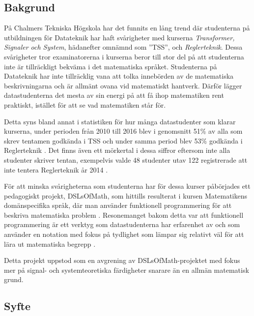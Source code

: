 \documentclass[]{article}
\begin{document}
\subsection{Bakgrund}

%

På Chalmers Tekniska Högskola har det funnits en lång trend där
studenterna på utbildningen för Datateknik har haft svårigheter
med kurserna \textit{Transformer, Signaler och System}, hädanefter omnämnd
som ''TSS'', och \textit{Reglerteknik}.
Dessa svårigheter tror examinatorerna i kurserna beror till stor del på att
studenterna inte är tillräckligt bekväma i det matematiska språket.
Studenterna på Datateknik har inte tillräcklig vana att tolka innebörden av de matematiska beskrivningarna och är allmänt ovana vid matematiskt hantverk.
Därför lägger datastudenterna det mesta av sin energi på att få ihop matematiken
rent praktiskt, istället för att se vad matematiken står för.

Detta syns bland annat i statistiken för hur många datastudenter som
klarar kurserna, under perioden från 2010 till 2016 blev i genomsnitt 51\% av
alla som skrev tentamen godkända i TSS och under samma period blev 53\% godkända
i Reglerteknik \cite{tentastatistik}. Det finns även ett mörkertal i dessa siffror
eftersom inte alla studenter skriver tentan, exempelvis valde 48 studenter utav 122
registrerade att inte tentera Reglerteknik år 2014 \cite{kursinformation:ere102:14-15}.

För att minska svårigheterna som studenterna har för dessa kurser påbörjades
ett pedagogiskt projekt, DSLsOfMath, som hittills resulterat i kursen
Matematikens domänspecifika språk, där man använder funktionell
programmering för att beskriva matematiska problem \cite{kursplan:dslsofmath}.
Resonemanget bakom detta var att funktionell programmering är ett verktyg
som datastudenterna har erfarenhet av och som använder en notation med
fokus på tydlighet som lämpar sig relativt väl för att lära ut matematiska
begrepp \cite{TFPIE15_DSLsofMath_IonescuJansson}.

Detta projekt uppstod som en avgrening av DSLsOfMath-projektet med fokus mer på signal- och systemteoretiska färdigheter snarare än en allmän matematisk grund.

\subsection{Syfte}
\end{document}
